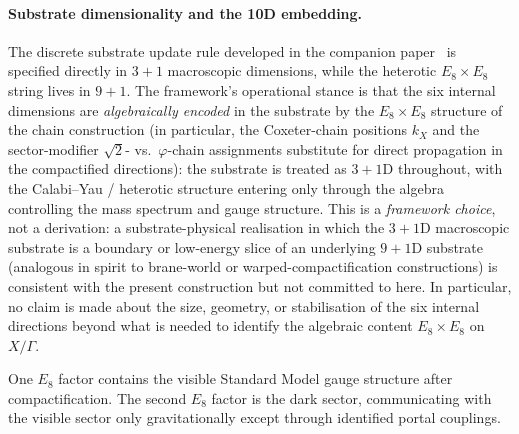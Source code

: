 ﻿\documentclass[reprint,amsmath,amssymb,aps,prd,longbibliography,floatfix]{revtex4-2}
\begin{document}
\paragraph{Substrate dimensionality and the 10D embedding.}
The discrete substrate update rule developed in the companion
paper~\cite{UnreasonableEffectiveness} is specified directly in
$3+1$ macroscopic dimensions, while the heterotic $E_8 \times E_8$
string lives in $9+1$. The framework's
operational stance is that the six internal dimensions are
\emph{algebraically encoded} in the substrate by the
$E_8 \times E_8$ structure of the chain construction (in
particular, the Coxeter-chain positions $k_X$ and the
sector-modifier $\sqrt{2}$- vs.\ $\varphi$-chain assignments
substitute for direct propagation in the compactified
directions): the substrate is treated as $3+1$D throughout, with
the Calabi--Yau / heterotic structure entering only through the
algebra controlling the mass spectrum and gauge structure. This
is a \emph{framework choice}, not a derivation: a substrate-physical
realisation in which the $3+1$D macroscopic substrate is a
boundary or low-energy slice of an underlying $9+1$D substrate
(analogous in spirit to brane-world or warped-compactification
constructions) is consistent with the present construction but
not committed to here. In particular, no claim is made about the
size, geometry, or stabilisation of the six internal directions
beyond what is needed to identify the algebraic content
$E_8 \times E_8$ on $X/\Gamma$.

One $E_8$ factor contains the visible Standard Model gauge structure
after compactification. The second $E_8$ factor is the dark sector,
communicating with the visible sector only gravitationally except
through identified portal couplings.
\end{document}
